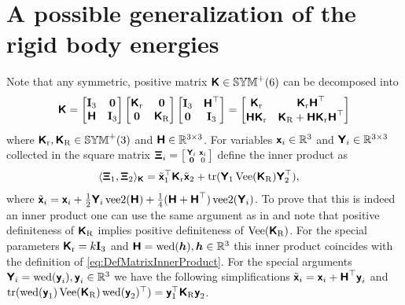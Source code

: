 \section{A possible generalization of the rigid body energies}\label{sec:GenRigidBodyPotential}
Note that any symmetric, positive matrix $\protoK \in \SymMatP(6)$ can be decomposed into
\begin{align}
 \protoK
 = \begin{bmatrix} \idMat[3] & \mat{0} \\ \protoH & \idMat[3] \end{bmatrix}
   \begin{bmatrix} \protoKr & \mat{0} \\ \mat{0} & \protoKR \end{bmatrix}
   \begin{bmatrix} \idMat[3] & \protoH^\top \\ \mat{0} & \idMat[3] \end{bmatrix}
 = \begin{bmatrix} \protoKr & \protoKr \protoH^\top\\ \protoH \protoKr & \protoKR + \protoH \protoKr \protoH^\top \end{bmatrix}
\end{align}
where $\protoKr, \protoKR \in \SymMatP(3)$ and $\protoH \in \RealNum^{3\times3}$.
For variables $\protox_i \in \RealNum^3$ and $\protoY_i \in \RealNum^{3\times3}$ collected in the square matrix $\protoXi_i = \left[\begin{smallmatrix} \protoY_i & \protox_i \\ \mat{0} & 0 \end{smallmatrix}\right]$ define the inner product as
\begin{align}\label{eq:DefGenRogodBodyInnerProduct}
 \sProd[\protoK]{\protoXi_1}{\protoXi_2} &= \tilde{\protox}_1^\top \protoKr \tilde{\protox}_2 + \tr(\protoY_1 \veeMatOp(\protoKR) \protoY_2^\top),
\end{align}
where $\tilde{\protox}_i = \protox_i + \tfrac{1}{2} \protoY_i\veeTwoOp(\protoH) + \tfrac{1}{4}(\protoH+\protoH^\top)\veeTwoOp(\protoY_i)$.
To prove that this is indeed an inner product one can use the same argument as in  and note that positive definiteness of $\protoKR$ implies positive definiteness of $\veeMatOp(\protoKR)$.
For the special parameters $\protoKr = k\idMat[3]$ and $\protoH = \wedOp(\tuple{h}), \tuple{h}\in\RealNum^3$ this inner product coincides with the definition of \eqref{eq:DefMatrixInnerProduct}.
For the special arguments $\protoY_i = \wedOp(\protoy_i), \protoy_i\in \RealNum^3$ we have the following simplifications $\tilde{\protox}_i = \protox_i + \protoH^\top \protoy_i$ and $\tr(\wedOp(\protoy_1) \veeMatOp(\protoKR) \wedOp(\protoy_2)^\top) = \protoy_1^\top \protoKR \protoy_2$.
